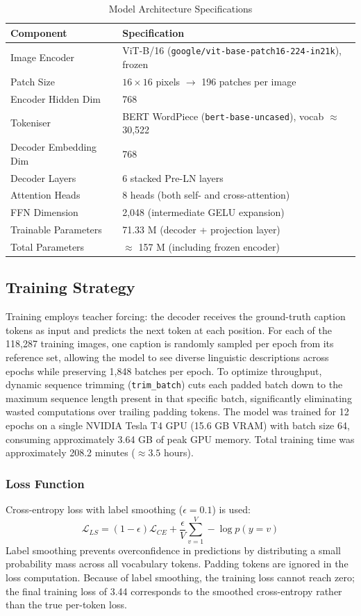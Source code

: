 \documentclass[conference]{IEEEtran}
\begin{document}
\begin{table}[htbp]
\caption{Model Architecture Specifications}
\label{tab:model_specs}
\centering
\small
\begin{tabular}{@{}ll@{}}
\toprule
\textbf{Component} & \textbf{Specification} \\
\midrule
Image Encoder & ViT-B/16 (\texttt{google/vit-base-patch16-224-in21k}), frozen \\
Patch Size & $16 \times 16$ pixels $\rightarrow$ 196 patches per image \\
Encoder Hidden Dim & 768 \\
Tokeniser & BERT WordPiece (\texttt{bert-base-uncased}), vocab $\approx$ 30,522 \\
Decoder Embedding Dim & 768 \\
Decoder Layers & 6 stacked Pre-LN layers \\
Attention Heads & 8 heads (both self- and cross-attention) \\
FFN Dimension & 2,048 (intermediate GELU expansion) \\
Trainable Parameters & 71.33 M (decoder + projection layer) \\
Total Parameters & $\approx$ 157 M (including frozen encoder) \\
\bottomrule
\end{tabular}
\end{table}

\subsection{Training Strategy}
Training employs teacher forcing: the decoder receives the ground-truth caption tokens as input and predicts the next token at each position. For each of the 118,287 training images, one caption is randomly sampled per epoch from its reference set, allowing the model to see diverse linguistic descriptions across epochs while preserving 1,848 batches per epoch. To optimize throughput, dynamic sequence trimming (\texttt{trim\_batch}) cuts each padded batch down to the maximum sequence length present in that specific batch, significantly eliminating wasted computations over trailing padding tokens. The model was trained for 12 epochs on a single NVIDIA Tesla T4 GPU (15.6 GB VRAM) with batch size 64, consuming approximately 3.64 GB of peak GPU memory. Total training time was approximately 208.2 minutes ($\approx 3.5$ hours).

\subsubsection{Loss Function}
Cross-entropy loss with label smoothing ($\epsilon = 0.1$) is used:
\begin{equation}
    \mathcal{L}_{LS} = (1 - \epsilon)\mathcal{L}_{CE} + \frac{\epsilon}{V}\sum_{v=1}^V -\log p(y=v)
\end{equation}
Label smoothing prevents overconfidence in predictions by distributing a small probability mass across all vocabulary tokens. Padding tokens are ignored in the loss computation. Because of label smoothing, the training loss cannot reach zero; the final training loss of 3.44 corresponds to the smoothed cross-entropy rather than the true per-token loss.
\end{document}
